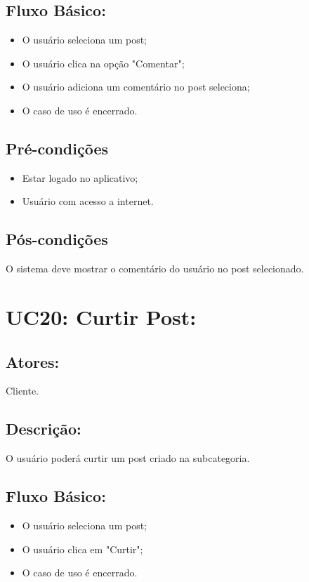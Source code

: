 \subsection{Fluxo Básico:}

\begin{itemize}
    \item O usuário seleciona um post;
    \item O usuário clica na opção "Comentar";
    \item O usuário adiciona um comentário no post seleciona;
    \item O caso de uso é encerrado. 
\end{itemize}

\subsection{Pré-condições}
\begin{itemize}
    \item Estar logado no aplicativo;
    \item Usuário com acesso a internet. 
\end{itemize}
\subsection{Pós-condições}
O sistema deve mostrar o comentário do usuário no post selecionado.   

\section{UC20: Curtir Post: }

\subsection{Atores:}
 Cliente. 
\subsection{Descrição:}
O usuário poderá curtir um post criado na subcategoria.
\subsection{Fluxo Básico:}

\begin{itemize}
    \item O usuário seleciona um post;
    \item O usuário clica em "Curtir";
    \item O caso de uso é encerrado.
\end{itemize}

